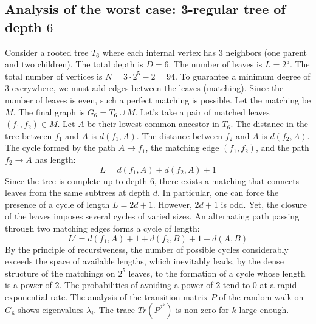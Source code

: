 \documentclass[12pt,a4paper]{article}
\begin{document}
\subsection{Analysis of the worst case: 3-regular tree of depth $6$}
Consider a rooted tree $T_{6}$ where each internal vertex has 3 neighbors (one parent and two children).
The total depth is $D = 6$.
The number of leaves is $L = 2^{5}$.
The total number of vertices is $N = 3 \cdot 2^{5} - 2 = 94$.
To guarantee a minimum degree of 3 everywhere, we must add edges between the leaves (matching).
Since the number of leaves is even, such a perfect matching is possible.
Let the matching be $M$. The final graph is $G_{6} = T_{6} \cup M$.
Let's take a pair of matched leaves $(f_1, f_2) \in M$.
Let $A$ be their lowest common ancestor in $T_{6}$.
The distance in the tree between $f_1$ and $A$ is $d(f_1, A)$.
The distance between $f_2$ and $A$ is $d(f_2, A)$.
The cycle formed by the path $A \to f_1$, the matching edge $(f_1, f_2)$, and the path $f_2 \to A$ has length:
$$ L = d(f_1, A) + d(f_2, A) + 1 $$
Since the tree is complete up to depth $6$, there exists a matching that connects leaves from the same subtrees at depth $d$.
In particular, one can force the presence of a cycle of length $L = 2d + 1$. However, $2d+1$ is odd.
Yet, the closure of the leaves imposes several cycles of varied sizes. An alternating path passing through two matching edges forms a cycle of length:
$$ L' = d(f_1, A) + 1 + d(f_2, B) + 1 + d(A, B) $$
By the principle of recursiveness, the number of possible cycles considerably exceeds the space of available lengths, which inevitably leads, by the dense structure of the matchings on $2^{5}$ leaves, to the formation of a cycle whose length is a power of 2. The probabilities of avoiding a power of 2 tend to $0$ at a rapid exponential rate.
The analysis of the transition matrix $P$ of the random walk on $G_{6}$ shows eigenvalues $\lambda_i$. The trace $Tr(P^{2^k})$ is non-zero for $k$ large enough.
\end{document}
